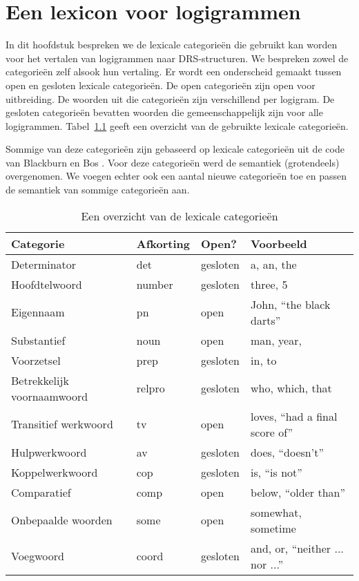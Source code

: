 \chapter{Een lexicon voor logigrammen}
\label{ch:lexicon}
In dit hoofdstuk bespreken we de lexicale categorieën die gebruikt kan worden voor het vertalen van logigrammen naar DRS-structuren. We bespreken zowel de categorieën zelf alsook hun vertaling. Er wordt een onderscheid gemaakt tussen open en gesloten lexicale categorieën. De open categorieën zijn open voor uitbreiding. De woorden uit die categorieën zijn verschillend per logigram. De gesloten categorieën bevatten woorden die gemeenschappelijk zijn voor alle logigrammen. Tabel~\ref{tbl:lexiconCategories} geeft een overzicht van de gebruikte lexicale categorieën.

Sommige van deze categorieën zijn gebaseerd op lexicale categorieën uit de code van Blackburn en Bos \cite{Blackburn2006}. Voor deze categorieën werd de semantiek (grotendeels) overgenomen. We voegen echter ook een aantal nieuwe categorieën toe en passen de semantiek van sommige categorieën aan.

\begin{table}[t]
  \centering
  \begin{tabular}{llll}
    \toprule
    \textbf{Categorie} & \textbf{Afkorting} & \textbf{Open?} & \textbf{Voorbeeld}  \\ \midrule
    Determinator       & det                & gesloten & a, an, the \\
    Hoofdtelwoord      & number             & gesloten & three, 5      \\
    Eigennaam          & pn                 & open     & John, ``the black darts'' \\
    Substantief        & noun               & open     & man, year, \\
    Voorzetsel         & prep               & gesloten & in, to \\
    Betrekkelijk voornaamwoord & relpro     & gesloten & who, which, that \\
    Transitief werkwoord & tv               & open     & loves, ``had a final score of'' \\
    Hulpwerkwoord      & av                 & gesloten & does, ``doesn't'' \\
    Koppelwerkwoord    & cop                & gesloten & is, ``is not'' \\
    Comparatief        & comp               & open     & below, ``older than'' \\
    Onbepaalde woorden & some               & open     & somewhat, sometime \\
    Voegwoord          & coord              & gesloten & and, or, ``neither ... nor ...'' \\
    \bottomrule
  \end{tabular}
  \caption{Een overzicht van de lexicale categorieën}
  \label{tbl:lexiconCategories}
\end{table}

